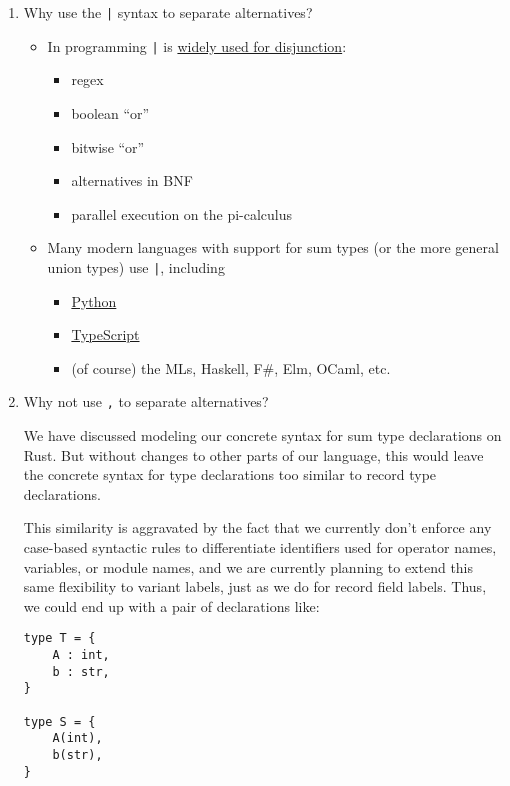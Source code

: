 \documentclass[11pt]{article}
\begin{document}
\begin{enumerate}
\item Why use the \texttt{|} syntax to separate alternatives?
\label{sec:org2585d56}

\begin{itemize}
\item In programming \texttt{|} is \href{https://en.wikipedia.org/wiki/Vertical\_bar\#Disjunction}{widely used for disjunction}:
\begin{itemize}
\item regex
\item boolean ``or''
\item bitwise ``or''
\item alternatives in BNF
\item parallel execution on the pi-calculus
\end{itemize}
\item Many modern languages with support for sum types (or the more general union
types) use \texttt{|}, including
\begin{itemize}
\item \href{https://docs.python.org/3/library/typing.html\#typing.Union}{Python}
\item \href{https://www.typescriptlang.org/docs/handbook/2/everyday-types.html\#union-types}{TypeScript}
\item (of course) the MLs, Haskell, F\#, Elm, OCaml, etc.
\end{itemize}
\end{itemize}

\item Why not use \texttt{,} to separate alternatives?
\label{sec:org36d828e}

We have discussed modeling our concrete syntax for sum type declarations on
Rust. But without changes to other parts of our language, this would leave the
concrete syntax for type declarations too similar to record type declarations.

This similarity is aggravated by the fact that we currently don't enforce any
case-based syntactic rules to differentiate identifiers used for  operator
names, variables, or module names, and we are currently planning to extend this
same flexibility to variant labels, just as we do for record field labels.
Thus, we could end up with a pair of declarations like:

\begin{verbatim}
type T = {
    A : int,
    b : str,
}

type S = {
    A(int),
    b(str),
}
\end{verbatim}


\end{enumerate}
\end{document}

